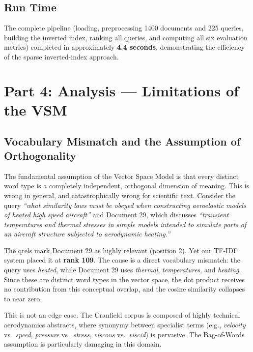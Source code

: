 \documentclass{article}
\begin{document}
\subsection{Run Time}

The complete pipeline (loading, preprocessing 1400 documents and 225 queries, building the inverted index, ranking all queries, and computing all six evaluation metrics) completed in approximately \textbf{4.4 seconds}, demonstrating the efficiency of the sparse inverted-index approach.

\section{Part 4: Analysis --- Limitations of the VSM}

\subsection{Vocabulary Mismatch and the Assumption of Orthogonality}

The fundamental assumption of the Vector Space Model is that every distinct word type is a completely independent, orthogonal dimension of meaning. This is wrong in general, and catastrophically wrong for scientific text. Consider the query \textit{``what similarity laws must be obeyed when constructing aeroelastic models of heated high speed aircraft''} and Document 29, which discusses \textit{``transient temperatures and thermal stresses in simple models intended to simulate parts of an aircraft structure subjected to aerodynamic heating.''}

The qrels mark Document 29 as highly relevant (position 2). Yet our TF-IDF system placed it at \textbf{rank 109}. The cause is a direct vocabulary mismatch: the query uses \textit{heated}, while Document 29 uses \textit{thermal}, \textit{temperatures}, and \textit{heating}. Since these are distinct word types in the vector space, the dot product receives no contribution from this conceptual overlap, and the cosine similarity collapses to near zero.

This is not an edge case. The Cranfield corpus is composed of highly technical aerodynamics abstracts, where synonymy between specialist terms (e.g., \textit{velocity} vs.\ \textit{speed}, \textit{pressure} vs.\ \textit{stress}, \textit{viscous} vs.\ \textit{viscid}) is pervasive. The Bag-of-Words assumption is particularly damaging in this domain.
\end{document}

